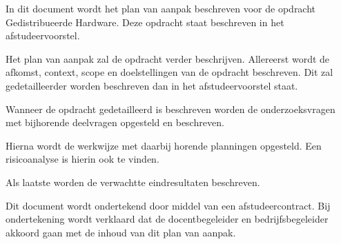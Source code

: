 \documentclass{../local}
\begin{document}
In dit document wordt het plan van aanpak beschreven voor de opdracht Gedistribueerde Hardware. Deze opdracht staat beschreven in het afstudeervoorstel. 

Het plan van aanpak zal de opdracht verder beschrijven. Allereerst wordt de afkomst, context, scope en doelstellingen van de opdracht beschreven. Dit zal gedetailleerder worden beschreven dan in het afstudeervoorstel staat. 

Wanneer de opdracht gedetailleerd is beschreven worden de onderzoeksvragen met bijhorende deelvragen opgesteld en beschreven. 

Hierna wordt de werkwijze met daarbij horende planningen opgesteld. Een risicoanalyse is hierin ook te vinden.

Als laatste worden de verwachtte eindresultaten beschreven.

Dit document wordt ondertekend door middel van een afstudeercontract. Bij ondertekening wordt verklaard dat de docentbegeleider en bedrijfsbegeleider akkoord gaan met de inhoud van dit plan van aanpak.
\end{document}
